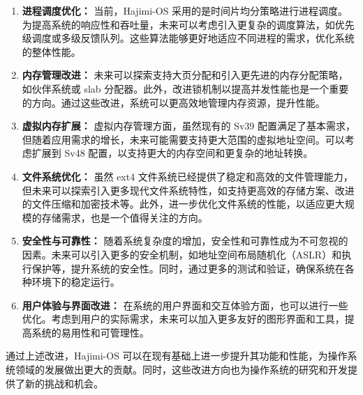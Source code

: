 \documentclass[UTF8]{article}
\begin{document}
\begin{enumerate}
  \item \textbf{进程调度优化：} 当前，Hajimi-OS 采用的是时间片均分策略进行进程调度。为提高系统的响应性和吞吐量，未来可以考虑引入更复杂的调度算法，如优先级调度或多级反馈队列。这些算法能够更好地适应不同进程的需求，优化系统的整体性能。

  \item \textbf{内存管理改进：} 未来可以探索支持大页分配和引入更先进的内存分配策略，如伙伴系统或 slab 分配器。此外，改进锁机制以提高并发性能也是一个重要的方向。通过这些改进，系统可以更高效地管理内存资源，提升性能。

  \item \textbf{虚拟内存扩展：} 虚拟内存管理方面，虽然现有的 Sv39 配置满足了基本需求，但随着应用需求的增长，未来可能需要支持更大范围的虚拟地址空间。可以考虑扩展到 Sv48 配置，以支持更大的内存空间和更复杂的地址转换。

  \item \textbf{文件系统优化：} 虽然 ext4 文件系统已经提供了稳定和高效的文件管理能力，但未来可以探索引入更多现代文件系统特性，如支持更高效的存储方案、改进的文件压缩和加密技术等。此外，进一步优化文件系统的性能，以适应更大规模的存储需求，也是一个值得关注的方向。

  \item \textbf{安全性与可靠性：} 随着系统复杂度的增加，安全性和可靠性成为不可忽视的因素。未来可以引入更多的安全机制，如地址空间布局随机化（ASLR）和执行保护等，提升系统的安全性。同时，通过更多的测试和验证，确保系统在各种环境下的稳定运行。

  \item \textbf{用户体验与界面改进：} 在系统的用户界面和交互体验方面，也可以进行一些优化。考虑到用户的实际需求，未来可以加入更多友好的图形界面和工具，提高系统的易用性和可管理性。
\end{enumerate}

通过上述改进，Hajimi-OS 可以在现有基础上进一步提升其功能和性能，为操作系统领域的发展做出更大的贡献。同时，这些改进方向也为操作系统的研究和开发提供了新的挑战和机会。
\end{document}

